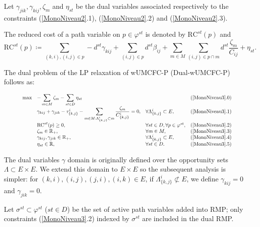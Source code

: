 Let \(\gamma_{jik}, \gamma_{kij}, \zeta_m\) and \(\eta_{st}\) be the dual variables associated respectively to the constraints (\ref{MonoNiveau2}.1), (\ref{MonoNiveau2}.2) and (\ref{MonoNiveau2}.3).

The reduced cost of a path variable on \(p \in \varphi^{st}\) is denoted by \(\textrm{RC}^{st}(p)\) and
\begin{equation}\textrm{RC}^{st}(p) \coloneqq  \sum_{(k,i),(i,j) \in p} -d^{st}\gamma_{kij}+\sum_{(i,j) \in p} d^{st}\beta_{ij} + \sum_{m \in M}\sum_{(i,j) \in p \cap m} d^{st}\frac{\zeta_{m}}{C_{ij}}+  \eta_{st}.
\end{equation}

 The dual problem of the LP relaxation of wUMCFC-P (Dual-wUMCFC-P) follows as:
 


\begin{equation}
\resizebox{0.91\hsize}{!}{$
\begin{array}{llll}
\max  &-  \displaystyle \sum_{m \in M} \zeta_m - \displaystyle  \sum_{st \in D} \displaystyle  \eta_{st}           &&  (\ref{MonoNiveau3}.0)\\
& \gamma_{kij} + \gamma_{jik} -   \tau^i_{\{k,j\}}- \displaystyle\sum_{m \in M: \Lambda^i_{\{k,j\}} \subset m} \frac{\zeta_m}{C^i_{\{k,j\}}}  = 0,                  &  \forall   \Lambda^i_{\{k,j\}} \subset E, &(\ref{MonoNiveau3}.1)\\
& \textrm{RC}^{st}(p)   \ge 0,   & \forall st \in D, \forall p \in \varphi^{st}, &(\ref{MonoNiveau3}.2)\\
& \zeta_m \in  \mathbb{R}_{+},  &
\forall m \in M,
&(\ref{MonoNiveau3}.3)\\
& \gamma_{kij},\gamma_{jik} \in \mathbb{R}_{+},   &  \forall    \Lambda^i_{\{k,j\}} \subset E, &(\ref{MonoNiveau3}.4)\\
&\eta_{st} \in \mathbb{R},  & \forall st \in D. &(\ref{MonoNiveau3}.5)
\end{array}
$}
\label{MonoNiveau3}
\end{equation}


The dual variables \(\gamma\) domain is originally defined over the opportunity sets $\Lambda \subset E \times E$. We extend this domain to \(E \times E\) so the subsequent analysis is simpler: for \((k,i),(i,j), (j,i), (i,k) \in E\), if $ \Lambda^i_{\{k,j\}} \not \subset E$, we define $\gamma_{kij}= 0$ and $\gamma_{jik}=0$.

Let \(\sigma^{st} \subset \varphi^{st}\) (\( st \in D\)) be the set of active path variables added into RMP; only constraints (\ref{MonoNiveau3}.2) indexed by \(\sigma^{st}\) are included in the dual RMP.

